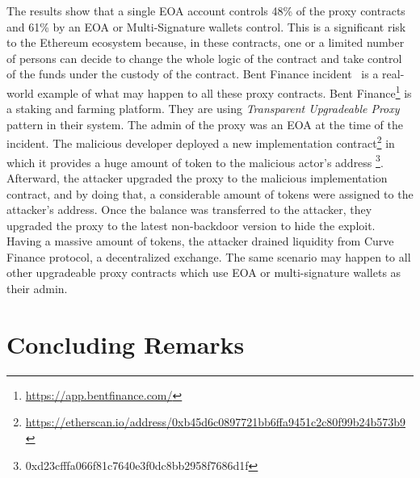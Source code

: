 The results show that a single EOA account controls 48\% of the proxy contracts and 61\% by an EOA or Multi-Signature wallets control. This is a significant risk to the Ethereum ecosystem because, in these contracts, one or a limited number of persons can decide to change the whole logic of the contract and take control of the funds under the custody of the contract.
Bent Finance incident~\cite{bentFinanceHack} is a real-world example of what may happen to all these proxy contracts. Bent Finance\footnote{\url{https://app.bentfinance.com/}} is a staking and farming platform. They are using \textit{Transparent Upgradeable Proxy} pattern in their system. The admin of the proxy was an EOA at the time of the incident. The malicious developer deployed a new implementation contract\footnote{\url{https://etherscan.io/address/0xb45d6c0897721bb6ffa9451c2c80f99b24b573b9}} in which it provides a huge amount of token to the malicious actor's address \footnote{0xd23cfffa066f81c7640e3f0dc8bb2958f7686d1f}. 
Afterward, the attacker upgraded the proxy to the malicious implementation contract, and by doing that, a considerable amount of tokens were assigned to the attacker's address. Once the balance was transferred to the attacker, they upgraded the proxy to the latest non-backdoor version to hide the exploit. 
Having a massive amount of tokens, the attacker drained liquidity from Curve Finance protocol, a decentralized exchange.
The same scenario may happen to all other upgradeable proxy contracts which use EOA or multi-signature wallets as their admin.




\section{Concluding Remarks}


